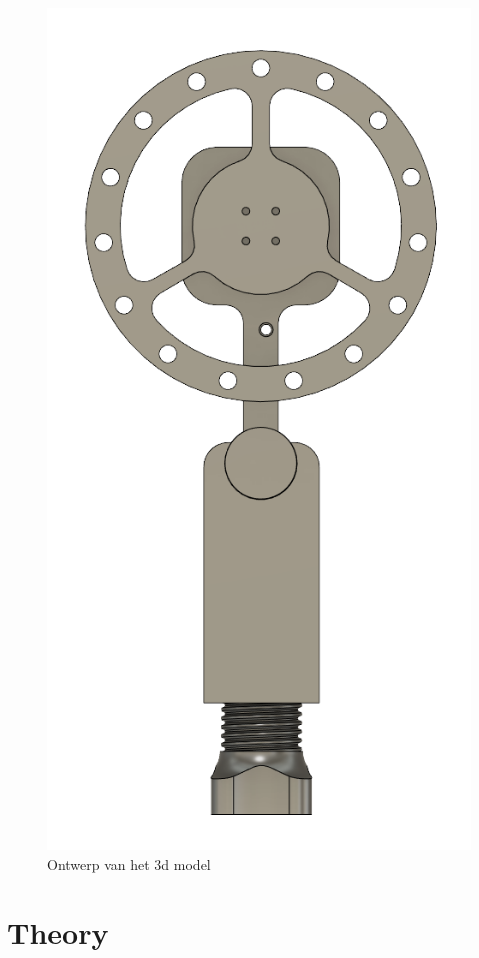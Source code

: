 \documentclass{article}
\begin{document}
\begin{multicols}{2}
\begin{figure}[H]
\centering
\includegraphics[scale=0.35]{Pendulum}
\caption{Ontwerp van het 3d model}
\label{fig:3d ontwerp}
\end{figure}

\section{Theory}


\end{multicols}
\end{document}
